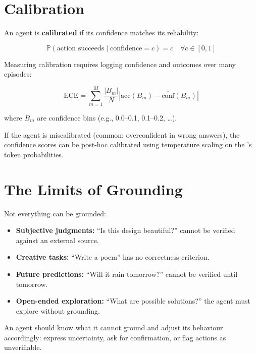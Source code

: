 \section{Calibration}

An agent is \textbf{calibrated} if its confidence matches its reliability:

\begin{equation}
	\mathbb{P}(\text{action succeeds} \mid \text{confidence} = c) = c \quad \forall c \in [0, 1]
\end{equation}

Measuring calibration requires logging confidence and outcomes over many episodes:

\begin{equation}
	\text{ECE} = \sum_{m=1}^{M} \frac{|B_m|}{N} \left|\text{acc}(B_m) - \overline{\text{conf}}(B_m)\right|
\end{equation}

where $B_m$ are confidence bins (e.g., 0.0--0.1, 0.1--0.2, \dots).

If the agent is miscalibrated (common: overconfident in wrong answers), the confidence scores can be post-hoc calibrated using temperature scaling on the \llm's token probabilities.

\section{The Limits of Grounding}

Not everything can be grounded:

\begin{itemize}
	\item \textbf{Subjective judgments:} ``Is this design beautiful?'' cannot be verified against an external source.
	\item \textbf{Creative tasks:} ``Write a poem'' has no correctness criterion.
	\item \textbf{Future predictions:} ``Will it rain tomorrow?'' cannot be verified until tomorrow.
	\item \textbf{Open-ended exploration:} ``What are possible solutions?'' the agent must explore without grounding.
\end{itemize}

\begin{principle}
	An agent should know what it cannot ground and adjust its behaviour accordingly: express uncertainty, ask for confirmation, or flag actions as unverifiable.
\end{principle}

